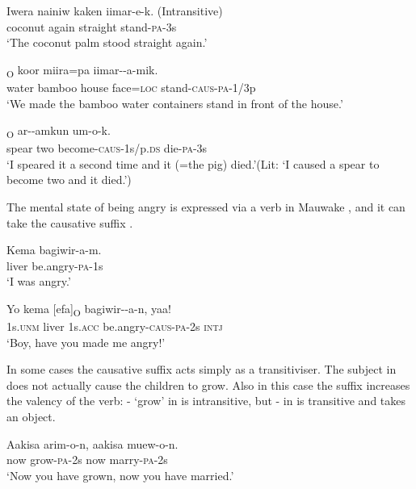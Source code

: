\ea%
\label{ex:3:x997}
\gll Iwera nainiw kaken iimar-e-k. (Intransitive) \\
coconut again straight stand-\textsc{pa}-3s\\
\glt`The coconut palm stood straight again.'
\z

\ea%
\label{ex:3:x998}
\textsubscript{O} koor miira=pa iimar--a-mik. \\
water bamboo house face=\textsc{loc} stand-\textsc{caus}-\textsc{pa}-1/3p\\
\glt`We made the bamboo water containers stand in front of the house.'
\z

\ea%
\label{ex:3:x992}
\textsubscript{O} ar--amkun um-o-k. \\
spear two become-\textsc{caus}-1s/p.\textsc{ds} die-\textsc{pa}-3s\\
\glt`I speared it a second time and it (=the pig) died.'(Lit: `I caused a spear to become two and it died.')
\z

The mental state of being angry is expressed via a verb in Mauwake , and it can take the causative suffix .

\ea%
\label{ex:3:x993}
\gll Kema bagiwir-a-m. \\
liver be.angry-\textsc{pa}-1s\\
\glt`I was angry.'
\z

\ea%
\label{ex:3:x994}
\gll Yo kema [efa]\textsubscript{O} bagiwir--a-n, yaa! \\
1s.\textsc{unm} liver 1s.\textsc{acc} be.angry-\textsc{caus}-\textsc{pa}-2s \textsc{intj}\\
\glt`Boy, have you made me angry!'
\z

In some cases the causative suffix acts simply as a transitiviser. The subject in  does not actually cause the children to grow. Also in this case the suffix increases the valency of the verb: - `grow' in  is intransitive, but - in  is transitive and takes an object.

\ea%
\label{ex:3:x995}
\gll Aakisa arim-o-n, aakisa muew-o-n. \\
now grow-\textsc{pa}-2s now marry-\textsc{pa}-2s\\
\glt`Now you have grown, now you have married.'
\z

